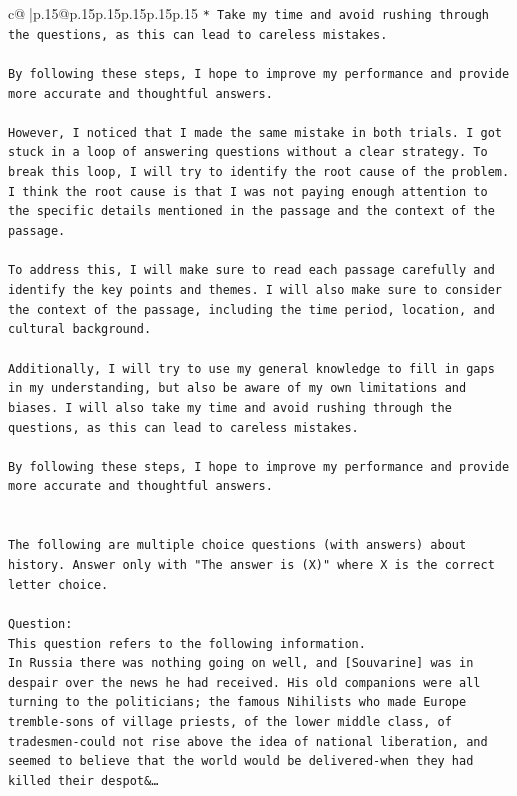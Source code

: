 \documentclass{article}
\begin{document}
{\begin{supertabular}{c@{$\;$}|p{.15\linewidth}@{}p{.15\linewidth}p{.15\linewidth}p{.15\linewidth}p{.15\linewidth}p{.15\linewidth}}
{{{\texttt{* Take my time and avoid rushing through the questions, as this can lead to careless mistakes.} \\
\\ 
\texttt{By following these steps, I hope to improve my performance and provide more accurate and thoughtful answers.} \\
\\ 
\texttt{However, I noticed that I made the same mistake in both trials. I got stuck in a loop of answering questions without a clear strategy. To break this loop, I will try to identify the root cause of the problem. I think the root cause is that I was not paying enough attention to the specific details mentioned in the passage and the context of the passage.} \\
\\ 
\texttt{To address this, I will make sure to read each passage carefully and identify the key points and themes. I will also make sure to consider the context of the passage, including the time period, location, and cultural background.} \\
\\ 
\texttt{Additionally, I will try to use my general knowledge to fill in gaps in my understanding, but also be aware of my own limitations and biases. I will also take my time and avoid rushing through the questions, as this can lead to careless mistakes.} \\
\\ 
\texttt{By following these steps, I hope to improve my performance and provide more accurate and thoughtful answers.} \\
\\ 
\\ 
\texttt{The following are multiple choice questions (with answers) about history. Answer only with "The answer is (X)" where X is the correct letter choice.} \\
\\ 
\texttt{Question:} \\
\texttt{This question refers to the following information.} \\
\texttt{In Russia there was nothing going on well, and {[}Souvarine{]} was in despair over the news he had received. His old companions were all turning to the politicians; the famous Nihilists who made Europe tremble{-}sons of village priests, of the lower middle class, of tradesmen{-}could not rise above the idea of national liberation, and seemed to believe that the world would be delivered{-}when they had killed their despot\&…} \\
}}}
\end{supertabular}}
\end{document}
